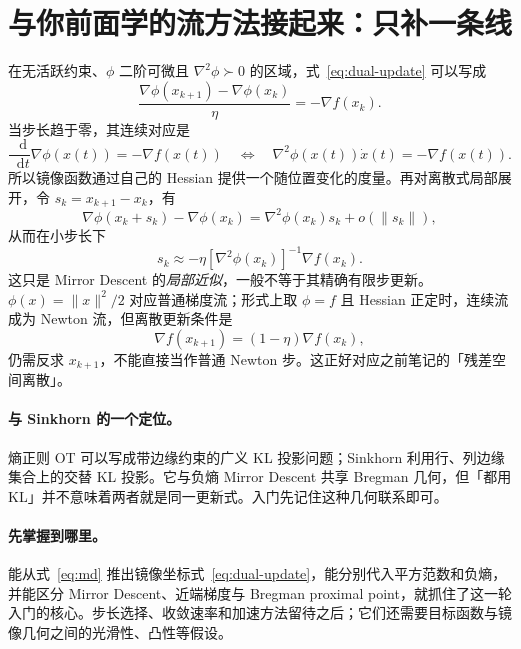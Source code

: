 \documentclass[11pt,a4paper]{ctexart}
\newcommand{\dd}{\mathop{}\!\mathrm d}
\begin{document}
\section{与你前面学的流方法接起来：只补一条线}
在无活跃约束、$\phi$ 二阶可微且 $\nabla^2\phi\succ0$ 的区域，式~\eqref{eq:dual-update} 可以写成
\[
\frac{\nabla\phi(x_{k+1})-\nabla\phi(x_k)}\eta=-\nabla f(x_k).
\]
当步长趋于零，其连续对应是
\begin{equation}\label{eq:mirror-flow}
\frac{\dd}{\dd t}\nabla\phi(x(t))=-\nabla f(x(t))
\quad\Longleftrightarrow\quad
\nabla^2\phi(x(t))\dot x(t)=-\nabla f(x(t)).
\end{equation}
所以镜像函数通过自己的 Hessian 提供一个随位置变化的度量。再对离散式局部展开，令 $s_k=x_{k+1}-x_k$，有
\[
\nabla\phi(x_k+s_k)-\nabla\phi(x_k)
=\nabla^2\phi(x_k)s_k+o(\|s_k\|),
\]
从而在小步长下
\[
s_k\approx-\eta[\nabla^2\phi(x_k)]^{-1}\nabla f(x_k).
\]
这只是 Mirror Descent 的\emph{局部近似}，一般不等于其精确有限步更新。$\phi(x)=\|x\|^2/2$ 对应普通梯度流；形式上取 $\phi=f$ 且 Hessian 正定时，连续流成为 Newton 流，但离散更新条件是
\[
\nabla f(x_{k+1})=(1-\eta)\nabla f(x_k),
\]
仍需反求 $x_{k+1}$，不能直接当作普通 Newton 步。这正好对应之前笔记的「残差空间离散」。

\paragraph{与 Sinkhorn 的一个定位。}
熵正则 OT 可以写成带边缘约束的广义 KL 投影问题；Sinkhorn 利用行、列边缘集合上的交替 KL 投影。它与负熵 Mirror Descent 共享 Bregman 几何，但「都用 KL」并不意味着两者就是同一更新式。入门先记住这种几何联系即可。

\paragraph{先掌握到哪里。}
能从式~\eqref{eq:md} 推出镜像坐标式~\eqref{eq:dual-update}，能分别代入平方范数和负熵，并能区分 Mirror Descent、近端梯度与 Bregman proximal point，就抓住了这一轮入门的核心。步长选择、收敛速率和加速方法留待之后；它们还需要目标函数与镜像几何之间的光滑性、凸性等假设。
\end{document}
